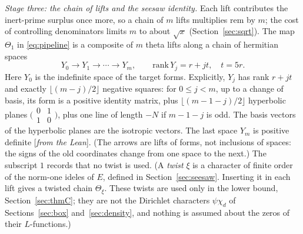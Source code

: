 \documentclass[11pt]{amsart}
\numberwithin{equation}{section}
\theoremstyle{definition}
\theoremstyle{remark}
\newcommand{\status}[1]{\textup{[\emph{#1}]}}
\begin{document}
\emph{Stage three: the chain of lifts and the seesaw identity.} Each lift contributes the inert-prime surplus once more, so a chain of $m$ lifts multiplies $\mathrm{rem}$ by $m$; the cost of controlling denominators limits $m$ to about $\sqrt x$ (Section~\ref{sec:sqrt}). The map $\Theta_1$ in \eqref{eq:pipeline} is a composite of $m$ theta lifts along a chain of hermitian spaces
\begin{equation}\label{eq:Ychain}
 Y_0\to Y_1\to\cdots\to Y_m,\qquad\mathrm{rank}\,Y_j=r+jt,\quad t=5r .
\end{equation}
Here $Y_0$ is the indefinite space of the target forms. Explicitly, $Y_j$ has rank $r+jt$ and exactly $\lfloor(m-j)/2\rfloor$ negative squares: for $0\le j<m$, up to a change of basis, its form is a positive identity matrix, plus $\lfloor(m-1-j)/2\rfloor$ hyperbolic planes $\bigl(\begin{smallmatrix}0&1\\1&0\end{smallmatrix}\bigr)$, plus one line of length $-N$ if $m-1-j$ is odd. The basis vectors of the hyperbolic planes are the isotropic vectors. The last space $Y_m$ is positive definite \status{from the Lean}. (The arrows are lifts of forms, not inclusions of spaces: the signs of the old coordinates change from one space to the next.) The subscript $1$ records that no twist is used. (A \emph{twist} $\xi$ is a character of finite order of the norm-one ideles of $E$, defined in Section~\ref{sec:seesaw}. Inserting it in each lift gives a twisted chain $\Theta_\xi$. These twists are used only in the lower bound, Section~\ref{sec:thmC}; they are not the Dirichlet characters $\psi\chi_d$ of Sections~\ref{sec:box} and~\ref{sec:density}, and nothing is assumed about the zeros of their $L$-functions.)
\end{document}
